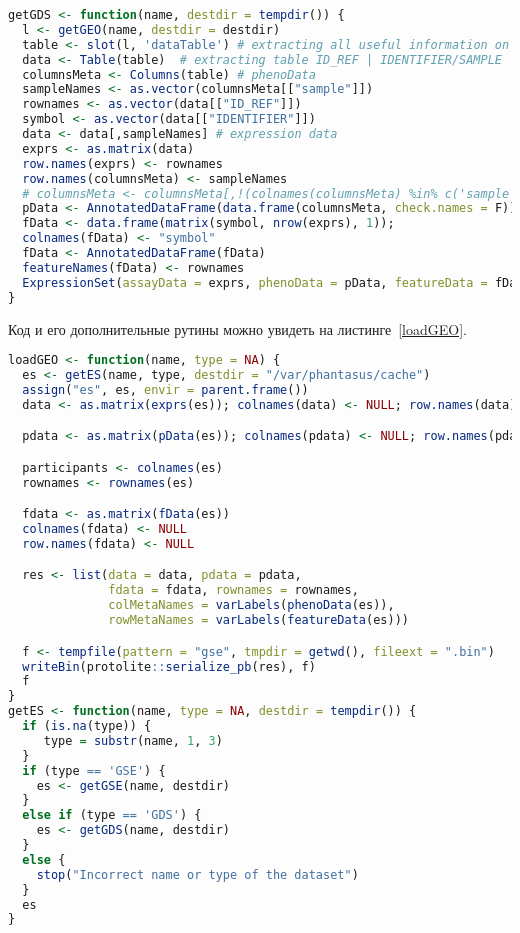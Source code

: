 \documentclass[annotation,specification]{itmo-student-thesis}
\begin{document}
\begin{lstlisting}[float=!h,caption={Загрузка данных типа GDS из Gene Expression Omnibus},label={getGDS},language=R]
 getGDS <- function(name, destdir = tempdir()) {
  l <- getGEO(name, destdir = destdir)
  table <- slot(l, 'dataTable') # extracting all useful information on dataset
  data <- Table(table)  # extracting table ID_REF | IDENTIFIER/SAMPLE | SAMPLE1 | ...
  columnsMeta <- Columns(table) # phenoData
  sampleNames <- as.vector(columnsMeta[["sample"]])
  rownames <- as.vector(data[["ID_REF"]])
  symbol <- as.vector(data[["IDENTIFIER"]])
  data <- data[,sampleNames] # expression data
  exprs <- as.matrix(data)
  row.names(exprs) <- rownames
  row.names(columnsMeta) <- sampleNames
  # columnsMeta <- columnsMeta[,!(colnames(columnsMeta) %in% c('sample'))] 
  pData <- AnnotatedDataFrame(data.frame(columnsMeta, check.names = F))
  fData <- data.frame(matrix(symbol, nrow(exprs), 1));
  colnames(fData) <- "symbol"
  fData <- AnnotatedDataFrame(fData)
  featureNames(fData) <- rownames
  ExpressionSet(assayData = exprs, phenoData = pData, featureData = fData)
}
\end{lstlisting}

Код и его дополнительные рутины можно увидеть на листинге~\ref{loadGEO}.

\begin{lstlisting}[float=!h,caption={Загрузка данных из Gene Expression Omnibus},label={loadGEO},language=R]
loadGEO <- function(name, type = NA) {
  es <- getES(name, type, destdir = "/var/phantasus/cache")
  assign("es", es, envir = parent.frame())
  data <- as.matrix(exprs(es)); colnames(data) <- NULL; row.names(data) <- NULL

  pdata <- as.matrix(pData(es)); colnames(pdata) <- NULL; row.names(pdata) <- NULL

  participants <- colnames(es)
  rownames <- rownames(es)

  fdata <- as.matrix(fData(es))
  colnames(fdata) <- NULL
  row.names(fdata) <- NULL

  res <- list(data = data, pdata = pdata,
              fdata = fdata, rownames = rownames,
              colMetaNames = varLabels(phenoData(es)),
              rowMetaNames = varLabels(featureData(es)))

  f <- tempfile(pattern = "gse", tmpdir = getwd(), fileext = ".bin")
  writeBin(protolite::serialize_pb(res), f)
  f
}
getES <- function(name, type = NA, destdir = tempdir()) {
  if (is.na(type)) {
     type = substr(name, 1, 3)
  }
  if (type == 'GSE') {
    es <- getGSE(name, destdir)
  }
  else if (type == 'GDS') {
    es <- getGDS(name, destdir)
  }
  else {
    stop("Incorrect name or type of the dataset")
  }
  es
}
\end{lstlisting}
\end{document}

